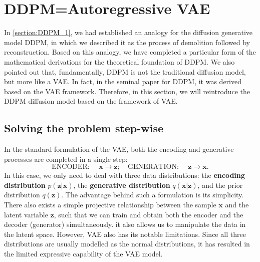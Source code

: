 \section{DDPM=Autoregressive VAE}

In \cref{section:DDPM_1}, we had established an analogy for the diffusion generative model DDPM, in which we described it as the process of demolition followed by reconstruction. Based on this analogy, we have completed a particular form of the mathematical derivations for the theoretical foundation of DDPM. We also pointed out that, fundamentally, DDPM is not the traditional diffusion model, but more like a VAE. In fact, in the seminal paper for DDPM\cite{ho2020denoising}, it was derived based on the VAE framework. Therefore, in this section, we will reintroduce the DDPM diffusion model based on the framework of VAE.

\subsection{Solving the problem step-wise}

In the standard formulation of the VAE,  both the encoding and generative processes are completed in a single step:
\begin{equation}
    \label{eq:2.1}
    \mbox{ENCODER: }\quad \bm{x}\to\bm{z};\quad\mbox{GENERATION: }\quad\bm{z}\to\bm{x}.
\end{equation}
In this case, we only need to deal with three data distributions: the \textbf{encoding distribution} $p(\bm{z}|\bm{x})$, the \textbf{generative distribution} $q(\bm{x}|\bm{z})$, and the prior distribution $q(\bm{z})$. The advantage behind such a formulation is its simplicity. There also exists a simple projective relationship between the sample $\bm{x}$ and the latent variable $\bm{z}$, such that we can train and obtain both the encoder and the decoder (generator) simultaneously. it also allows us to manipulate the data in the latent space. However, VAE also has its notable limitations. Since all three distributions are usually modelled as the normal distributions, it has resulted in the limited expressive capability of the VAE model. 


